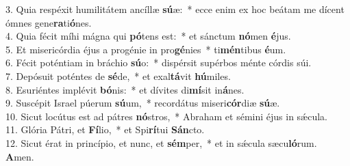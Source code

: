3. Quia respéxit humilitátem ancíllæ \textbf{sú}æ: * ecce enim ex hoc beátam me dícent ómnes gene\textbf{ra}ti\textbf{ó}nes.\\
4. Quia fécit míhi mágna qui \textbf{pó}tens est: * et sánctum \textbf{nó}men \textbf{é}jus.\\
5. Et misericórdia éjus a progénie in pro\textbf{gé}nies * ti\textbf{mén}tibus \textbf{é}um.\\
6. Fécit poténtiam in bráchio \textbf{sú}o: * dispérsit supérbos ménte córdis súi.\\
7. Depósuit poténtes de \textbf{sé}de, * et exal\textbf{tá}vit \textbf{hú}miles.\\
8. Esuriéntes implévit \textbf{bó}nis: * et dívites di\textbf{mí}sit in\textbf{á}nes.\\
9. Suscépit Israel púerum \textbf{sú}um, * recordátus miseri\textbf{cór}diæ \textbf{sú}æ.\\
10. Sicut locútus est ad pátres \textbf{nó}stros, * Abraham et sémini éjus in sǽcula.\\
11. Glória Pátri, et \textbf{Fí}lio, * et Spi\textbf{rí}tui \textbf{Sán}cto.\\
12. Sicut érat in princípio, et nunc, et \textbf{sém}per, * et in sǽcula sæcu\textbf{ló}rum.\\\textbf{A}men.